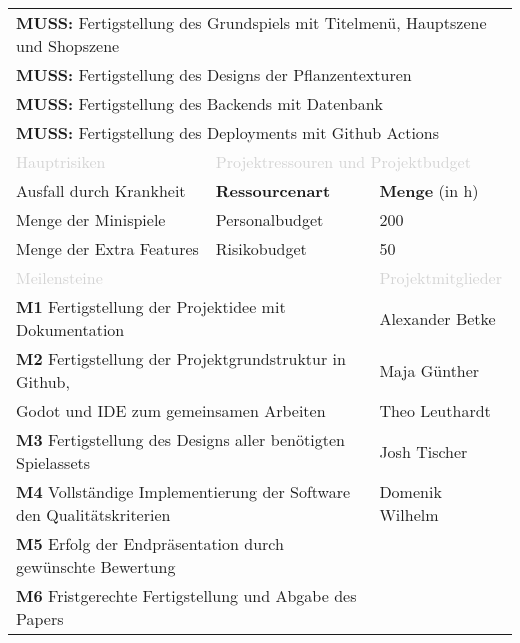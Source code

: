 \begin{table}[H]
\begin{tabular}{|l|l|l|}
        \multicolumn{3}{|l|}{\textbf{MUSS:} Fertigstellung des Grundspiels mit Titelmenü, Hauptszene und Shopszene}\\
        \multicolumn{3}{|l|}{\textbf{MUSS:} Fertigstellung des Designs der Pflanzentexturen}\\
        \multicolumn{3}{|l|}{\textbf{MUSS:} Fertigstellung des Backends mit Datenbank}\\
        \multicolumn{3}{|l|}{\textbf{MUSS:} Fertigstellung des Deployments mit Github Actions}\\
        \hline
        \footnotesize{\textcolor{lightgray}{Hauptrisiken}} & \multicolumn{2}{|l|}{\footnotesize{\textcolor{lightgray}{Projektressouren und Projektbudget}}}\\
        Ausfall durch Krankheit & \textbf{Ressourcenart} & \textbf{Menge} (in h) \\
        Menge der Minispiele & Personalbudget & 200\\
        Menge der Extra Features & Risikobudget & 50\\
        \hline
        \multicolumn{2}{|l|}{\footnotesize{\textcolor{lightgray}{Meilensteine}}} & \footnotesize{\textcolor{lightgray}{Projektmitglieder}}\\
        \multicolumn{2}{|l|}{\textbf{M1} Fertigstellung der Projektidee mit Dokumentation} & Alexander Betke\\
        \multicolumn{2}{|l|}{\textbf{M2} Fertigstellung der Projektgrundstruktur in Github,} & Maja Günther\\
        \multicolumn{2}{|l|}{Godot und IDE zum gemeinsamen Arbeiten} & Theo Leuthardt\\
        \multicolumn{2}{|l|}{\textbf{M3} Fertigstellung des Designs aller benötigten Spielassets} & Josh Tischer\\
        \multicolumn{2}{|l|}{\textbf{M4} Vollständige Implementierung der Software den Qualitätskriterien} & Domenik Wilhelm\\
        \multicolumn{2}{|l|}{\textbf{M5} Erfolg der Endpräsentation durch gewünschte Bewertung} & \\
        \multicolumn{2}{|l|}{\textbf{M6} Fristgerechte Fertigstellung und Abgabe des Papers} & \\
        \hline
    \end{tabular}
\end{table}